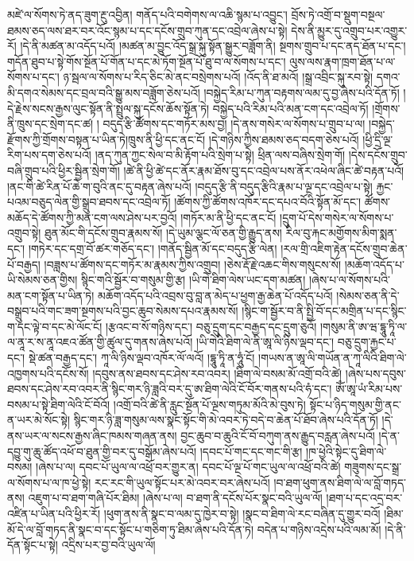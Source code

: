 མཛེ་ལ་སོགས་ཏེ་ནད་ཟུག་རྔུ་འབྱིན། གནོད་པའི་བགེགས་ལ་འཆི་སྙམ་པ་འབྱུང་། བྲོས་ཏེ་འགྲོ་བ་སྡུག་བསྔལ་ཐམས་ཅད་ལས་ཐར་བར་འོང་སྙམ་པ་དང་དངོས་གྲུབ་ཀུན་དང་འབྲེལ་ཞེས་པ་སྟེ། དེས་ནི་མྱུར་དུ་འགྲུབ་པར་འགྱུར་རོ། །དེ་ནི་མཚན་མ་འདོད་པའོ། །མཚན་མ་བྱུང་འོད་སྒྲ་སྐུ་སྟོན་སྒྱུར་བཟློག་ནི། སྔགས་གྲུབ་པ་དང་ནད་ཐོན་པ་དང་། གདོན་ཐུབ་པ་སྟེ་གོས་སྔོན་པོ་གོན་པ་དང་མེ་ཏོག་སྔོན་པོ་ཐུ་བ་ལ་སོགས་པ་དང་། ལུས་ལས་རྣག་ཁྲག་ཐོན་པ་ལ་སོགས་པ་དང་། ཉ་སྦལ་ལ་སོགས་པ་རིད་ཅིང་མེ་ནང་བསྲེགས་པའོ། །འོད་ནི་ཐ་མའོ། །སྒྲ་འབྲིང་སྐུ་རབ་སྟེ། དགའ་མི་དགའ་སེམས་དང་བྲལ་བའི་སྒྱུ་མས་བཟློག་ཅེས་པའོ། །བསྐྱེད་རིམ་པ་ཀུན་བརྟགས་ལམ་དུ་བྱ་ཞེས་པའི་དོན་ཏོ། །དེ་རྗེས་སངས་རྒྱས་ལུང་སྟོན་ནི་སྤྲུལ་སྐུ་དངོས་ཆོས་སྟོན་ཏེ། བསྐྱེད་པའི་རིམ་པའི་མན་ངག་དང་འབྲེལ་ཏོ། །གྲོགས་ནི་ཁྲུས་དང་སྲེག་དང་ཚ། །
བདུད་རྩི་ཚོགས་དང་གཏོར་མས་བྱ། །དེ་ནས་གསེར་ལ་སོགས་པ་གྲུབ་པ་ལ། །བསྐྱེད་རྫོགས་ཀྱི་གྲོགས་བསྟན་པ་ཡིན་ཏེ།ཁྲུས་ནི་ཕྱི་དང་ནང་ངོ། །དེ་གཉིས་ཀྱིས་ཐམས་ཅད་བདག་ཅེས་པའོ། །ཕྱི་དྲི་ལྔ་རིག་པས་དག་ཅེས་པའོ། །ནད་ཀུན་ཀྱང་སེལ་བ་མི་རྟོག་པའི་སྲེག་པ་སྟེ། ཕྲིན་ལས་བཞིས་སྲེག་གོ། །དེས་དངོས་གྲུབ་བཞི་གྲུབ་པའི་ཕྱིར་སྦྱིན་སྲེག་གོ། །ཚེ་ནི་ཕྱི་ཚེ་དང་ནོར་རྣམ་ཐོས་བུ་དང་འབྲེལ་པས་ནོར་འཕེལ་ཞིང་ཚེ་བརྟན་པའོ། །ནང་གི་ཚེ་རིན་པོ་ཆེ་ག་བུའི་ནང་དུ་བརྟན་ཞེས་པའོ། །བདུད་རྩི་ནི་བདུད་རྩིའི་རྣམ་པ་ལྔ་དང་འབྲེལ་པ་སྟེ། རྐྱང་པའམ་བཅུད་ལེན་གྱི་སྒྲུབ་ཐབས་དང་འབྲེལ་ཏོ། །ཚོགས་ཀྱི་ཚོགས་འཁོར་དང་དཔའ་བོའི་སྟོན་མོ་དང་། ཚོགས་མཆོད་དེ་ཚོགས་ཀྱི་མན་ངག་ལས་ཤེས་པར་བྱའོ། །གཏོར་མ་ནི་ཕྱི་དང་ནང་ངོ། །དྲུག་པོ་དེས་གསེར་ལ་སོགས་པ་འགྲུབ་སྟེ། ཐུན་མོང་གི་དངོས་གྲུབ་རྣམས་སོ། །དེ་ཡུམ་ལྕང་ལོ་ཅན་གྱི་རྒྱུད་ནས། རིལ་བུ་རྐང་མགྱོགས་མིག་སྨན་དང་། །གཏེར་དང་དགྲ་བོ་ཚར་གཅོད་དང་། །གནོད་སྦྱིན་མོ་དང་བདུད་རྩི་ལེན། །རལ་གྲི་འཇིག་རྟེན་དངོས་གྲུབ་ཆེན་པོ་བརྒྱད། །བཟླས་པ་ཚོགས་དང་གཏོར་མ་རྣམས་ཀྱིས་འགྲུབ། །ཅེས་རྡོ་རྗེ་འཆང་གིས་གསུངས་སོ། །མཆོག་འདོད་པ་ཡི་སེམས་ཅན་གྱིས། སྙིང་གའི་སྦྱོར་བ་གསུམ་གྱི་རྩ། །ཡི་གེ་ཐིག་ལེས་ཡང་དག་མཚན། །ཞེས་པ་ལ་སོགས་པའི་མན་ངག་སྟོན་པ་ཡིན་ཏེ། མཆོག་འདོད་པའི་འབྲས་བུ་བླ་ན་མེད་པ་ཕྱག་རྒྱ་ཆེན་པོ་འདོད་པའོ། །སེམས་ཅན་ནི་དེ་བསྒྲུབ་པའི་གང་ཟག་སྔགས་པའི་བྱང་ཆུབ་སེམས་དཔའ་རྣམས་སོ། །སྙིང་ག་སྦྱོར་བ་ནི་སྤྱི་བོ་དང་མགྲིན་པ་དང་སྙིང་ག་དང་ལྟེ་བ་དང་མེ་ལོང་ངོ། །རྩའང་བ་སོ་གཉིས་དང་། བཅུ་དྲུག་དང་བརྒྱད་དང་དྲུག་ཅུའོ། །གསུམ་ནི་ཨ་ཝ་དྷཱུ་ཏཱི་ལ་ལ་ནཱ་ར་ས་ནཱ་འཇའ་ཚོན་གྱི་ཚུལ་དུ་གནས་ཞེས་པའོ། །ཡི་གེའི་ཐིག་ལེ་ནི་ཨཱ་ལི་ཉིས་ལྡབ་དང་། བཅུ་དྲུག་རྐྱང་པ་དང་། སྡེ་ཚན་བརྒྱད་དང་། ཀཱ་ལི་ཉིས་ལྡབ་འཁོར་ལོ་ལའོ། །དྷཱུ་ཏཱི་ན་ཧཱུཾ་ངོ། །གཡས་ན་ཨཱ་ལི་གཡོན་ན་ཀཱ་ལིའི་ཐིག་ལེ་འཁྱགས་པའི་དངོས་སོ། །དབུས་ནས་ཐབས་དང་ཤེས་རབ་འབར། །ཐིག་ལེ་བསམ་མོ་འགྲོ་བའི་ཚེ། །ཞེས་པས་དབུས་ཐབས་དང་ཤེས་རབ་འབར་ནི་སྙིང་གར་ཉི་ཟླའི་བར་དུ་ཨ་ཐིག་ལེའི་ངོ་བོར་གནས་པའི་ཧཾ་དང་། ཨོཾ་ཨཱ་ཡཾ་རིམ་པས་བསམ་པ་སྟེ་ཐིག་ལེའི་ངོ་བོའོ། །འགྲོ་བའི་ཚེ་ནི་རླུང་སྔོན་པོ་ལྔས་གཏུམ་མོའི་མེ་བུས་ཏེ། སྟོང་པ་ཉིད་གསུམ་གྱི་ནང་ན་ཡར་མེ་སོང་སྟེ། སྙིང་གར་ཉི་ཟླ་གསུམ་ལས་སྣང་སྟོང་གི་མེ་འབར་ཏེ་བདེ་བ་ཆེན་པོ་ཐོབ་ཞེས་པའི་དོན་ཏོ། །དེ་ནས་ཡར་ལ་སངས་རྒྱས་ཞིང་ཁམས་གཞན་ནས། བྱང་ཆུབ་བ་ཆུའི་ངོ་བོ་བཀུག་ནས་རྒྱུད་བརླན་ཞེས་པའོ། །དེ་ན་དབྱུ་གུ་ཆུ་ཚོད་འཕོ་བ་ཐུན་གྱི་བར་དུ་བསྒོམ་ཞེས་པའོ། །དབང་པོ་གང་དང་གང་གི་རྩ། །ཁ་ཕྱེའི་སྟེང་དུ་ཐིག་ལེ་བསམ། །ཞེས་པ་ལ། དབང་པོ་ཡུལ་ལ་འཕྲོ་བར་གྱུར་ན། དབང་པོ་ལྔ་པོ་གང་ཡུལ་ལ་འཕྲོ་བའི་ཚེ། གཟུགས་དང་སྒྲ་ལ་སོགས་པ་ལ་ཁ་ཕྱེ་སྟེ། རང་རང་གི་ཡུལ་སྟོང་པར་མེ་འབར་བར་ཞེས་པའོ། །བ་ཐག་ཕུག་ནས་ཐིག་ལེ་ལ་བློ་གཏད་ནས། འཇུག་པ་བ་ཐག་གཞི་པོར་ཐིམ། །ཞེས་པ་ལ། བ་ཐག་ནི་དངོས་པོར་སྣང་བའི་ཡུལ་ལོ། །ཐག་པ་དང་འདྲ་བར་འཛིན་པ་ཡིན་པའི་ཕྱིར་རོ། །ཕུག་ནས་ནི་སྣང་བ་ལམ་དུ་ཁྱེར་བ་སྟེ། །སྣང་བ་ཐིག་ལེ་རང་བཞིན་དུ་གྱུར་བའོ། །ཐིམ་མོ་དེ་ལ་བློ་གཏད་ནི་སྣང་བ་དང་སྟོང་པ་གཅིག་ཏུ་ཐིམ་ཞེས་པའི་དོན་ཏེ། བདེན་པ་གཉིས་འདྲེས་པའི་ལམ་མོ། །དེ་ནི་དོན་སྟོང་པ་སྟེ། འདྲིས་པར་བྱ་བའི་ཡུལ་ལོ། 